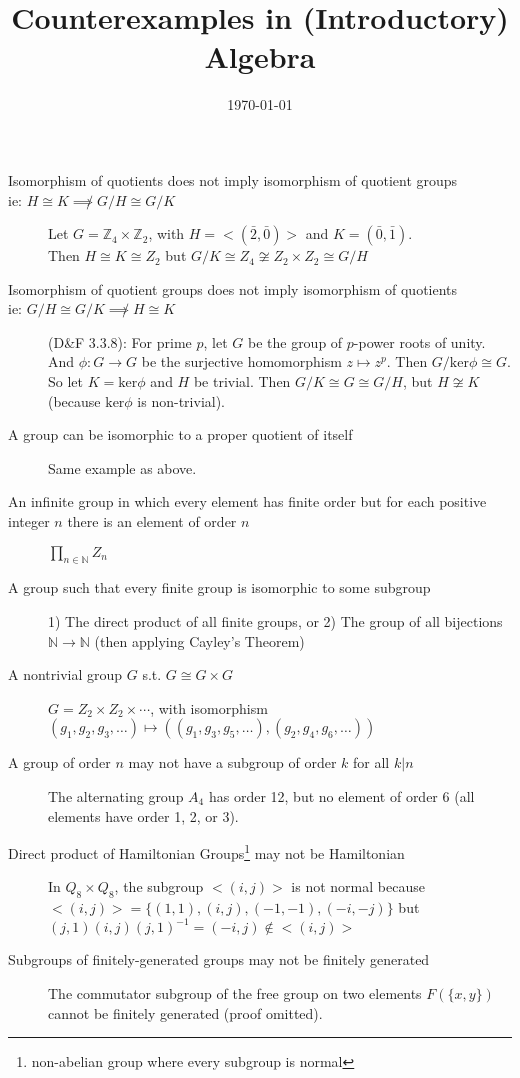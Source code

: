 \documentclass[]{article}
\title{Counterexamples in (Introductory) Algebra}
\author{}
\date{\today}
\newcommand{\x}{\times}
\newcommand{\Z}{\mathbb{Z}}
\begin{document}
\maketitle

\begin{description}
\item[Isomorphism of quotients does not imply isomorphism of quotient groups \\
ie: $H \cong K \not\implies G/H \cong G/K$]
Let $G =\Z_4 \x \Z_2$, with $H = <(\bar 2, \bar 0)>$ and $K = (\bar 0, \bar 1)$. \\
Then $H \cong K \cong Z_2$ but $G / K \cong Z_4 \not\cong Z_2 \x Z_2 \cong G / H$

\item[Isomorphism of quotient groups does not imply isomorphism of quotients \\
ie: $G/H \cong G/K \not\implies H \cong K$]
(D\&F 3.3.8): For prime $p$, let $G$ be the group of $p$-power roots of unity.
And $\phi: G \to G$ be the surjective homomorphism $z \mapsto z^p$. Then $G /
\text{ker} \phi \cong G$. \\
So let $K = \text{ker}\phi$ and $H$ be trivial. Then $G/K \cong G \cong G/H$,
but $H \not\cong K$ (because $\text{ker} \phi$ is non-trivial).

\item[A group can be isomorphic to a proper quotient of itself]
Same example as above.

\item[An infinite group in which every element has finite order but for each positive
integer $n$ there is an element of order $n$]
$\prod_{n \in \mathbb{N}} Z_n$

\item[A group such that every finite group is isomorphic to some subgroup]
1) The direct product of all finite groups, or 2) The group of all bijections
$\mathbb{N} \to \mathbb{N}$ (then applying Cayley's Theorem)

\item[A nontrivial group $G$ s.t. $G \cong G \x G$]
$G = Z_2 \x Z_2 \x \cdots$, with isomorphism $(g_1, g_2, g_3, \hdots) \mapsto
((g_1, g_3, g_5, \hdots), (g_2, g_4, g_6, \hdots))$

\item[A group of order $n$ may not have a subgroup of order $k$ for all $k | n$]
The alternating group $A_4$ has order 12, but no element of order 6 (all
elements have order 1, 2, or 3).

\item[Direct product of Hamiltonian Groups\footnote{non-abelian group where
every subgroup is normal} may not be Hamiltonian]
In $Q_8 \x Q_8$, the subgroup $<(i, j)>$ is not normal because $<(i, j)> = \{(1,
1), (i, j), (-1, -1), (-i, -j) \}$ but $(j, 1)(i, j)(j, 1)^{-1} = (-i, j)
\not\in <(i, j)>$

\item[Subgroups of finitely-generated groups may not be finitely generated]
The commutator subgroup of the free group on two elements $F(\{x, y\})$ cannot
be finitely generated (proof omitted).

\end{description}
\end{document}
